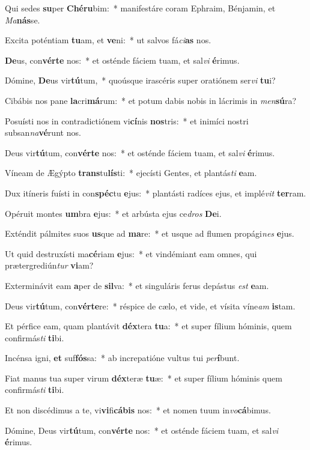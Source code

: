 \item Qui sedes \textbf{su}per \textbf{Ché}\textbf{ru}bim:~* manifestáre coram Ephraim, Bénjamin, et \textit{Ma}\textbf{nás}se.
\item Excita poténtiam \textbf{tu}am, et \textbf{ve}ni:~* ut salvos fá\textit{ci}\textbf{as} nos.
\item \textbf{De}us, con\textbf{vér}\textbf{te} nos:~* et osténde fáciem tuam, et sal\textit{vi} \textbf{é}rimus.
\item Dómine, \textbf{De}us vir\textbf{tú}tum,~* quoúsque irascéris super oratiónem ser\textit{vi} \textbf{tu}i?
\item Cibábis nos pane \textbf{la}cri\textbf{má}rum:~* et potum dabis nobis in lácrimis in \textit{men}\textbf{sú}ra?
\item Posuísti nos in contradictiónem vi\textbf{cí}nis \textbf{nos}tris:~* et inimíci nostri subsan\textit{na}\textbf{vé}runt nos.
\item Deus vir\textbf{tú}tum, con\textbf{vér}\textbf{te} nos:~* et osténde fáciem tuam, et sal\textit{vi} \textbf{é}rimus.
\item Víneam de Ægýpto \textbf{trans}tu\textbf{lís}ti:~* ejecísti Gentes, et plantás\textit{ti} \textbf{e}am.
\item Dux itíneris fuísti in con\textbf{spéc}tu \textbf{e}jus:~* plantásti radíces ejus, et implé\textit{vit} \textbf{ter}ram.
\item Opéruit montes \textbf{um}bra \textbf{e}jus:~* et arbústa ejus ce\textit{dros} \textbf{De}i.
\item Exténdit pálmites suos \textbf{us}que ad \textbf{ma}re:~* et usque ad flumen propági\textit{nes} \textbf{e}jus.
\item Ut quid destruxísti ma\textbf{cé}riam \textbf{e}jus:~* et vindémiant eam omnes, qui prætergrediún\textit{tur} \textbf{vi}am?
\item Exterminávit eam \textbf{a}per de \textbf{sil}va:~* et singuláris ferus depástus \textit{est} \textbf{e}am.
\item Deus vir\textbf{tú}tum, con\textbf{vér}\textbf{te}re:~* réspice de cælo, et vide, et vísita víne\textit{am} \textbf{is}tam.
\item Et pérfice eam, quam plantávit \textbf{déx}tera \textbf{tu}a:~* et super fílium hóminis, quem confirmás\textit{ti} \textbf{ti}bi.
\item Incénsa igni, \textbf{et} suf\textbf{fós}sa:~* ab increpatióne vultus tui \textit{per}\textbf{í}bunt.
\item Fiat manus tua super virum \textbf{déx}teræ \textbf{tu}æ:~* et super fílium hóminis quem confirmás\textit{ti} \textbf{ti}bi.
\item Et non discédimus a te, vi\textbf{vi}fi\textbf{cá}\textbf{bis} nos:~* et nomen tuum in\textit{vo}\textbf{cá}bimus.
\item Dómine, Deus vir\textbf{tú}tum, con\textbf{vér}\textbf{te} nos:~* et osténde fáciem tuam, et sal\textit{vi} \textbf{é}rimus.
